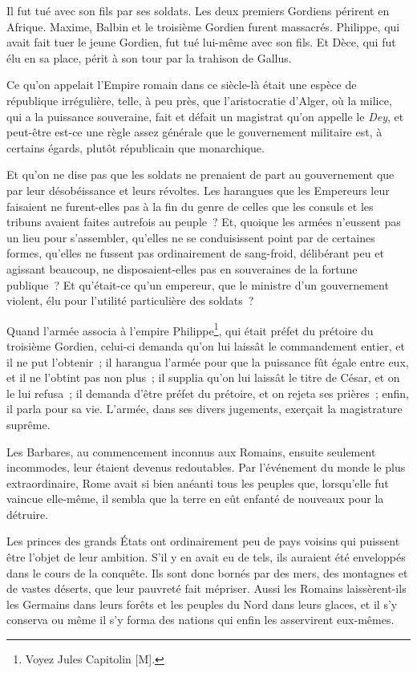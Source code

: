\documentclass[french,twoside]{book} %
\begin{document}
Il fut tué avec son fils par ses soldats. Les deux premiers Gordiens périrent en Afrique. Maxime, Balbin et le troisième Gordien furent massacrés. Philippe, qui avait fait tuer le jeune Gordien, fut tué lui-même avec son fils. Et Dèce, qui fut élu en sa place, périt à son tour par la trahison de Gallus.\par
Ce qu’on appelait l’Empire romain dans ce siècle-là était une espèce de république irrégulière, telle, à peu près, que l’aristocratie d’Alger, où la milice, qui a la puissance souveraine, fait et défait un magistrat qu’on appelle le {\itshape Dey}, et peut-être est-ce une règle assez générale que le gouvernement militaire est, à certains égards, plutôt républicain que monarchique.\par
Et qu’on ne dise pas que les soldats ne prenaient de part au gouvernement que par leur désobéissance et leurs révoltes. Les harangues que les Empereurs leur faisaient ne furent-elles pas à la fin du genre de celles que les consuls et les tribuns avaient faites autrefois au peuple ? Et, quoique les armées n’eussent pas un lieu pour s’assembler, qu’elles ne se conduisissent point par de certaines formes, qu’elles ne fussent pas ordinairement de sang-froid, délibérant peu et agissant beaucoup, ne disposaient-elles pas en souveraines de la fortune publique ? Et qu’était-ce qu’un empereur, que le ministre d’un gouvernement violent, élu pour l’utilité particulière des soldats ?\par
Quand l’armée associa à l’empire Philippe\footnote{Voyez Jules Capitolin [M].}, qui était préfet du prétoire du troisième Gordien, celui-ci demanda qu’on lui laissât le commandement entier, et il ne put l’obtenir ; il harangua l’armée pour que la puissance fût égale entre eux, et il ne l’obtint pas non plus ; il supplia qu’on lui laissât le titre de César, et on le lui refusa ; il demanda d’être préfet du prétoire, et on rejeta ses prières ; enfin, il parla pour sa vie. L’armée, dans ses divers jugements, exerçait la magistrature suprême.\par
Les Barbares, au commencement inconnus aux Romains, ensuite seulement incommodes, leur étaient devenus redoutables. Par l’événement du monde le plus extraordinaire, Rome avait si bien anéanti tous les peuples que, lorsqu’elle fut vaincue elle-même, il sembla que la terre en eût enfanté de nouveaux pour la détruire.\par
Les princes des grands États ont ordinairement peu de pays voisins qui puissent être l’objet de leur ambition. S’il y en avait eu de tels, ils auraient été enveloppés dans le cours de la conquête. Ils sont donc bornés par des mers, des montagnes et de vastes déserts, que leur pauvreté fait mépriser. Aussi les Romains laissèrent-ils les Germains dans leurs forêts et les peuples du Nord dans leurs glaces, et il s’y conserva ou même il s’y forma des nations qui enfin les asservirent eux-mêmes.\par
\end{document}
